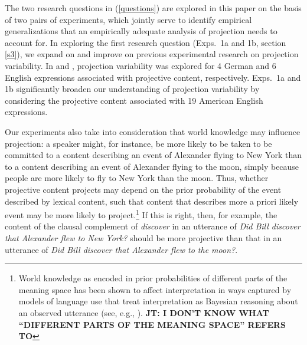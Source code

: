 \documentclass[11pt,fleqn]{article}
\newcommand{\6}{\mbox{$[\hspace*{-.6mm}[$}}
\newcommand{\9}{\mbox{$]\hspace*{-.6mm}]$}}
\begin{document}
The two research questions in (\ref{questions}) are explored in this paper on the basis of two pairs of experiments, which jointly serve to identify empirical generalizations that an empirically adequate analysis of projection needs to account for. In exploring the first research question (Exps.~1a and 1b, section \ref{s3}), we expand on and improve on previous experimental research on projection variability. In \citealt{xue-onea11} and \citealt{smith-hall11}, projection variability was explored for 4 German and 6 English expressions associated with projective content, respectively. Exps.~1a and 1b significantly broaden our understanding of projection variability by considering the projective content associated with 19 American English expressions. 

Our experiments also take into consideration that world knowledge may influence projection: a speaker might, for instance, be more likely to be taken to be committed to a content describing an event of Alexander flying to New York than to a content describing an event of Alexander flying to the moon, simply because people are more likely to fly to New York than the moon. Thus, whether projective content projects may depend on the prior probability of the event described by lexical content, such that content that describes more a priori likely event may be more likely to project.\footnote{World knowledge as encoded in prior probabilities of different parts of the meaning space has been shown to affect interpretation in ways captured by models of language use that treat interpretation as Bayesian reasoning about an observed utterance (see, e.g., \citealt{frankejaeger2016, goodmanfrank2016}). {\bf JT: I DON'T KNOW WHAT ``DIFFERENT PARTS OF THE MEANING SPACE'' REFERS TO}} If this is right, then, for example, the content of the clausal complement of {\em discover} in an utterance of {\em Did Bill discover that Alexander flew to New York?} should be more projective than that in an utterance of {\em Did Bill discover that Alexander flew to the moon?}. 
\end{document}
